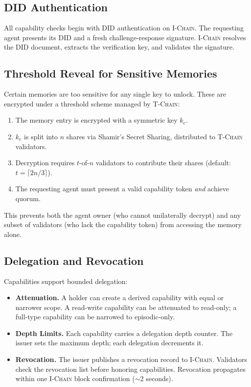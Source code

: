 \documentclass[11pt,letterpaper]{article}
\theoremstyle{definition}
\theoremstyle{remark}
\newcommand{\IChain}{\textsc{I-Chain}}
\newcommand{\TChain}{\textsc{T-Chain}}
\newcommand{\DID}{\textsc{DID}}
\begin{document}
\subsection{DID Authentication}

All capability checks begin with \DID{} authentication on \IChain{}. The requesting agent presents its \DID{} and a fresh challenge-response signature. \IChain{} resolves the \DID{} document, extracts the verification key, and validates the signature.

\subsection{Threshold Reveal for Sensitive Memories}

Certain memories are too sensitive for any single key to unlock. These are encrypted under a threshold scheme managed by \TChain{}:

\begin{enumerate}
    \item The memory entry is encrypted with a symmetric key $k_e$.
    \item $k_e$ is split into $n$ shares via Shamir's Secret Sharing, distributed to \TChain{} validators.
    \item Decryption requires $t$-of-$n$ validators to contribute their shares (default: $t = \lceil 2n/3 \rceil$).
    \item The requesting agent must present a valid capability token \emph{and} achieve quorum.
\end{enumerate}

This prevents both the agent owner (who cannot unilaterally decrypt) and any subset of validators (who lack the capability token) from accessing the memory alone.

\subsection{Delegation and Revocation}

Capabilities support bounded delegation:

\begin{itemize}
    \item \textbf{Attenuation.} A holder can create a derived capability with equal or narrower scope. A read-write capability can be attenuated to read-only; a full-type capability can be narrowed to episodic-only.
    \item \textbf{Depth Limits.} Each capability carries a delegation depth counter. The issuer sets the maximum depth; each delegation decrements it.
    \item \textbf{Revocation.} The issuer publishes a revocation record to \IChain{}. Validators check the revocation list before honoring capabilities. Revocation propagates within one \IChain{} block confirmation ($\sim$2 seconds).
\end{itemize}
\end{document}
